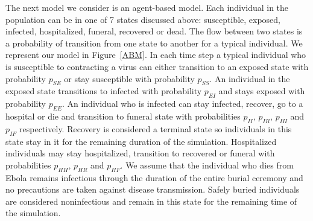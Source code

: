 The next model we consider is an agent-based model. Each individual in the population can be in one of 7 states discussed above: susceptible, exposed, infected, hospitalized, funeral, recovered or dead. The flow between two states is a  probability of transition from one state to another for a typical individual. We represent our model in Figure~\ref{ABM}. In each time step a typical individual who is susceptible to contracting a virus can either transition to an exposed state with probability $p_{SE}$ or stay susceptible with probability $p_{SS}$. An individual in the exposed state transitions to infected with probability $p_{EI}$ and stays exposed with probability $p_{EE}$. An individual who is infected can stay infected, recover, go to a hospital or die and transition to funeral state with probabilities $p_{II},\, p_{IR},\, p_{IH}$ and $p_{IF}$ respectively. Recovery is considered a terminal state so individuals in this state stay in it for the remaining duration of the simulation. Hospitalized individuals may stay hospitalized, transition to recovered or funeral with probabilities $p_{HH}, \, p_{HR}$ and $p_{HF}$. We assume that the individual who dies from Ebola remains infectious through the duration of the entire burial ceremony and no precautions are taken against disease transmission. Safely buried individuals are considered noninfectious and remain in this state for the remaining time of the simulation.  


